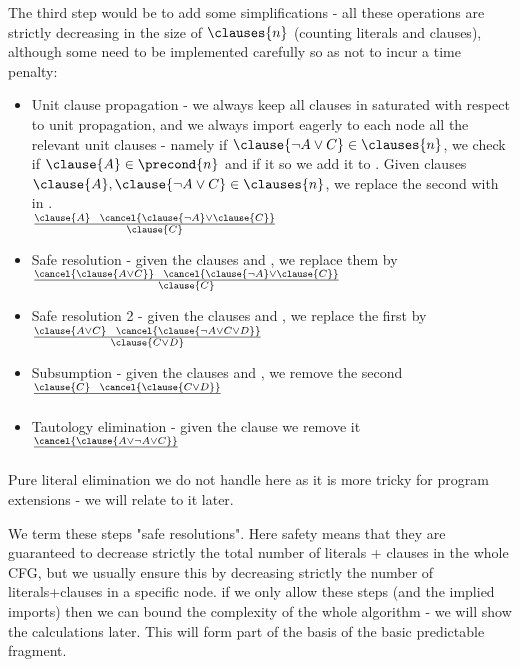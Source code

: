 The third step would be to add some simplifications - all these operations are strictly decreasing in the size of $\clauses{n}$ (counting literals and clauses), although some need to be implemented carefully so as not to incur a time penalty:
\begin{itemize}
	\item Unit clause propagation - we always keep all clauses in  saturated with respect to unit propagation, and we always import eagerly to each node all the relevant unit clauses - namely if $\clause{\lnot A \lor C} \in {}$, we check if $\clause{A} \in \precond{n}$ and if it so we add it to \clauses{n}.
	Given clauses $\clause{A}, \clause{\lnot A \lor C} \in \clauses{n}$, we replace the second with  in .\\
	$\frac{\clause{A}~~\cancel{\clause{\lnot A}\lor\clause{C}}}{\clause{C}}$
	\item Safe resolution - given the clauses  and , we replace them by \\
	$\frac{\cancel{\clause{A\lor C}}~~\cancel{\clause{\lnot A}\lor\clause{C}}}{\clause{C}}$
	\item Safe resolution 2 - given the clauses  and , we replace the first by \\
	$\frac{\clause{A\lor C}~~\cancel{\clause{\lnot A\lor C \lor D}}}{\clause{C\lor D}}$
	\item Subsumption - given the clauses  and , we remove the second \\
	$\frac{\clause{C} ~~ \cancel{\clause{C\lor D}}}{}$
	\item Tautology elimination - given the clause  we remove it\\
	$\frac{\cancel{\clause{A \lor \lnot A \lor C}}}{}$
\end{itemize}
Pure literal elimination we do not handle here as it is more tricky for program extensions - we will relate to it later.

We term these steps "safe resolutions". Here safety means that they are guaranteed to decrease strictly the total number of literals + clauses in the whole CFG, but we usually ensure this by decreasing strictly the number of literals+clauses in a specific node. if we only allow these steps (and the implied imports) then we can bound the complexity of the whole algorithm - we will show the calculations later. This will form part of the basis of the basic predictable fragment.

